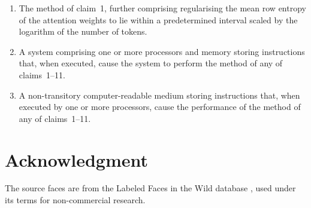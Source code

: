 \documentclass[conference]{IEEEtran}
\begin{document}
\begin{enumerate}
\item[\textbf{11.}] The method of claim~1, further comprising regularising the mean
row entropy of the attention weights to lie within a predetermined interval scaled
by the logarithm of the number of tokens.

\item[\textbf{12.}] A system comprising one or more processors and memory storing
instructions that, when executed, cause the system to perform the method of any of
claims~1--11.

\item[\textbf{13.}] A non-transitory computer-readable medium storing instructions
that, when executed by one or more processors, cause the performance of the method
of any of claims~1--11.
\end{enumerate}
\normalsize

\section*{Acknowledgment}
The source faces are from the Labeled Faces in the Wild database
\cite{huang2007lfw}, used under its terms for non-commercial research.



\end{document}

